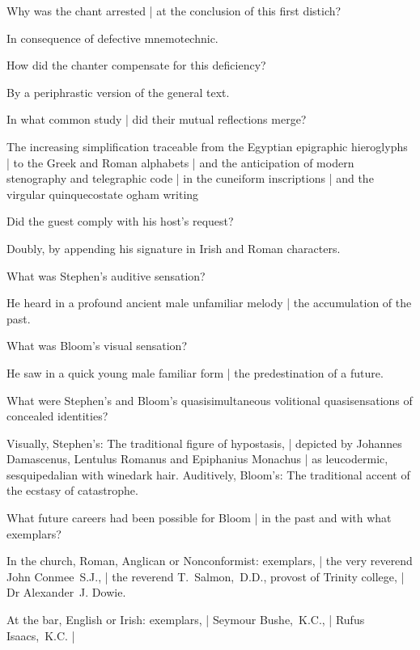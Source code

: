 \Bloom


Why was the chant arrested |
at the conclusion of this first distich?

\Factual
In consequence of defective mnemotechnic.


How did the chanter compensate for this deficiency?

\Factual
By a periphrastic version of the general text.


In what common study |
did their mutual reflections merge?

\Science
The increasing simplification
traceable from the Egyptian epigraphic hieroglyphs |
to the Greek and Roman alphabets |
and the anticipation of modern stenography and telegraphic code |
in the cuneiform inscriptions
 |
and the virgular quinquecostate ogham writing



Did the guest comply with his host's request?

\Factual
Doubly, by appending his signature in Irish and Roman characters.


What was Stephen's auditive sensation?

\Memories
He heard in a profound ancient male unfamiliar melody |
the accumulation of the past.


What was Bloom's visual sensation?

\Factual
He saw in a quick young male familiar form |
the predestination of a future.


What were Stephen's and Bloom's quasisimultaneous volitional quasisensations
of concealed identities?

\Factual
Visually, Stephen's:
The traditional figure of hypostasis, |
depicted by Johannes Damascenus, Lentulus Romanus and Epiphanius Monachus |
as leucodermic, sesquipedalian with winedark hair.
Auditively, Bloom's:
The traditional accent of the ecstasy of catastrophe.


What future careers had been possible for Bloom |
in the past and with what exemplars?

\Religious
In the church, Roman, Anglican or Nonconformist:
exemplars, |
the very reverend John Conmee~S.J., |
the reverend T.~Salmon,~D.D., provost of Trinity college, |
Dr Alexander~J. Dowie.

\Factual
At the bar, English or Irish:
exemplars, |
Seymour Bushe,~K.C., |
Rufus Isaacs,~K.C. |

